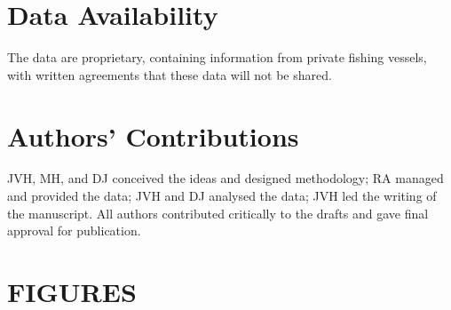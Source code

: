 \documentclass[11pt, titlepage]{article}
\begin{document}
\begin{spacing}{1.9}
\begin{flushleft}
\section*{Data Availability}

The data are proprietary, containing information from private fishing vessels, with written agreements that these data will not be shared.

\section*{Authors' Contributions}

JVH, MH, and DJ conceived the ideas and designed methodology; RA managed and provided the data; JVH and DJ analysed the data; JVH led the writing of the manuscript. All authors contributed critically to the drafts and gave final approval for publication.


%


%
%


\newpage
{}

\section*{FIGURES}



\end{flushleft}
\end{spacing}
\end{document}
